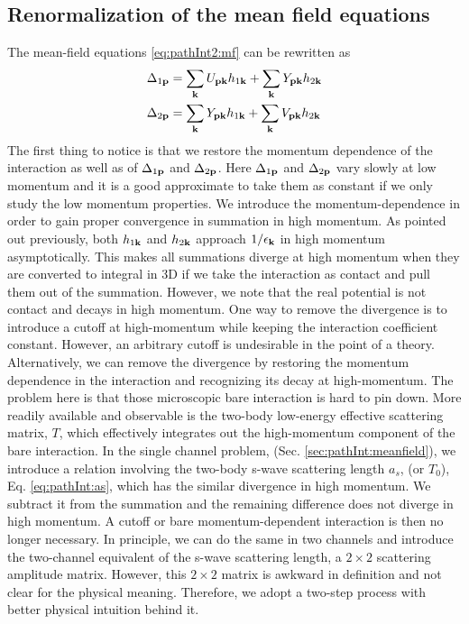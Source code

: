 \subsection {Renormalization of the mean field equations\label{sec:pathInt2:ren}}
The mean-field equations \ref{eq:pathInt2:mf} can be rewritten as 
\begin{align}
\Delta_{1\mathbf{p}}&=\sum_{\mathbf{k}}{}U_{\mathbf{p}\mathbf{k}}h_{1\mathbf{k}}+\sum_{\mathbf{k}}{}Y_{\mathbf{p}\mathbf{k}}h_{2\mathbf{k}}\label{eq:pathInt2:mfopen}\\
\Delta_{2\mathbf{p}}&=\sum_{\mathbf{k}}{}Y_{\mathbf{p}\mathbf{k}}h_{1\mathbf{k}}+\sum_{\mathbf{k}}{}V_{\mathbf{p}\mathbf{k}}h_{2\mathbf{k}}\label{eq:pathInt2:mfclose}
\end{align}
The first thing to notice is that we restore the momentum dependence of the interaction as well as of $\Delta_{1\mathbf{p}}$ and $\Delta_{2\mathbf{p}}$.     Here $\Delta_{1\mathbf{p}}$ and $\Delta_{2\mathbf{p}}$ vary slowly at low momentum and  it is a good approximate to take them as constant if we only study the low momentum properties.  We introduce the momentum-dependence in order to gain proper convergence in summation in high momentum. As pointed out previously, both $h_{1\mathbf{k}}$ and $h_{2\mathbf{k}}$ approach $1/\epsilon_{\mathbf{k}}$ in high momentum asymptotically.  This  makes  all summations diverge at high momentum when they are converted to integral in 3D if we take the interaction as contact and pull them out of the summation.  However, we note that the real potential is not contact and decays in high momentum.  One way to remove the divergence is to  introduce  a cutoff at high-momentum while keeping the interaction coefficient constant.  However, an arbitrary cutoff is  undesirable in the point of a theory.  Alternatively, we can remove the divergence by restoring the momentum dependence in the  interaction and recognizing its decay at high-momentum.    The problem here is that those microscopic bare interaction is hard to pin down.      More readily available and observable is the two-body low-energy effective scattering matrix, $T$, which effectively integrates out the high-momentum component of the bare interaction.             In the single channel problem, (Sec. \ref{sec:pathInt:meanfield}),  we  introduce a relation involving the two-body s-wave scattering length $a_{s}$, (or $T_{0}$), Eq. \eqref{eq:pathInt:as}, which has the similar divergence in high momentum.  We subtract it from the summation and the remaining difference does not diverge in high momentum.  A cutoff or bare momentum-dependent interaction is then no longer necessary.  In principle, we can do the same in two channels and introduce the two-channel equivalent of the s-wave scattering length, a $2\times2$ scattering amplitude matrix.  However, this $2\times2$ matrix is awkward in definition and not clear for the physical meaning.   Therefore, we adopt a two-step process with better physical intuition behind it.   

